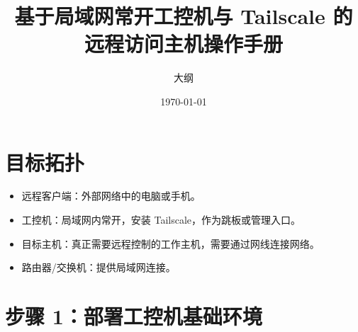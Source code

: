 \documentclass[12pt,a4paper]{ctexart}
\title{基于局域网常开工控机与 Tailscale 的远程访问主机操作手册}
\author{大纲}
\date{\today}
\begin{document}
\maketitle
\tableofcontents
\clearpage



\section{目标拓扑}
\begin{itemize}[leftmargin=2em]
    \item 远程客户端：外部网络中的电脑或手机。
    \item 工控机：局域网内常开，安装 Tailscale，作为跳板或管理入口。
    \item 目标主机：真正需要远程控制的工作主机，需要通过网线连接网络。
    \item 路由器/交换机：提供局域网连接。
\end{itemize}



\section{步骤 1：部署工控机基础环境}
\end{document}
